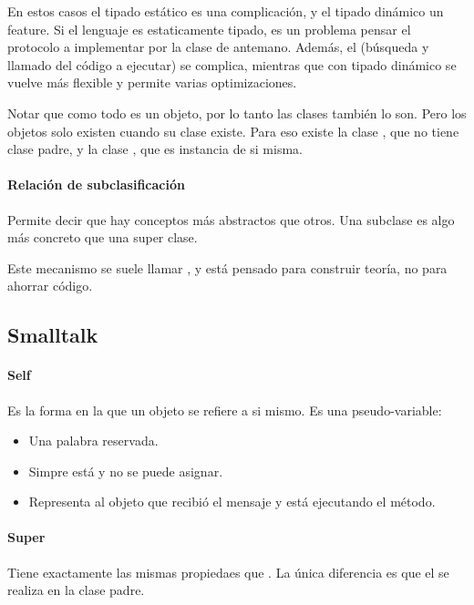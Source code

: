 En estos casos el tipado estático es una complicación, y el tipado dinámico un feature. Si el lenguaje es estaticamente tipado, es un problema pensar el protocolo a implementar por la clase de antemano. Además, el  (búsqueda y llamado del código a ejecutar) se complica, mientras que con tipado dinámico se vuelve más flexible y permite varias optimizaciones.

Notar que como todo es un objeto, por lo tanto las clases también lo son. Pero los objetos solo existen cuando su clase existe. Para eso existe la clase , que no tiene clase padre, y la clase , que es instancia de si misma.

\paragraph{Relación de subclasificación}

Permite decir que hay conceptos más abstractos que otros. Una subclase es algo más concreto que una super clase.

Este mecanismo se suele llamar , y está pensado para construir teoría, no para ahorrar código.

\subsection{Smalltalk}

\paragraph{Self}

Es la forma en la que un objeto se refiere a si mismo. Es una pseudo-variable:
\begin{itemize}
  \item Una palabra reservada.
  \item Simpre está y no se puede asignar.
  \item Representa al objeto que recibió el mensaje y está ejecutando el método.
\end{itemize}

\paragraph{Super}

Tiene exactamente las mismas propiedaes que . La única diferencia es que el  se realiza en la clase padre.

